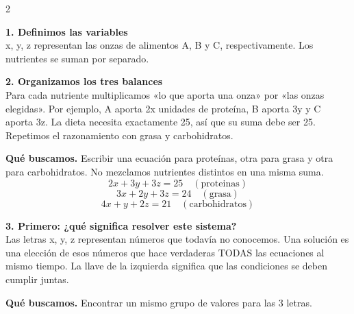\documentclass[11pt,a4paper,landscape]{article}
\begin{document}
\begin{multicols*}{2}
\noindent\begin{minipage}{\linewidth}\textbf{1. Definimos las variables}\\[2pt]x, y, z representan las onzas de alimentos A, B y C, respectivamente. Los nutrientes se suman por separado.
\par{}\par\smallskip
\end{minipage}\par\medskip
\noindent\begin{minipage}{\linewidth}\textbf{2. Organizamos los tres balances}\\[2pt]Para cada nutriente multiplicamos «lo que aporta una onza» por «las onzas elegidas». Por ejemplo, A aporta 2x unidades de proteína, B aporta 3y y C aporta 3z. La dieta necesita exactamente 25, así que su suma debe ser 25. Repetimos el razonamiento con grasa y carbohidratos.
\par\smallskip\textbf{Qué buscamos.} Escribir una ecuación para proteínas, otra para grasa y otra para carbohidratos. No mezclamos nutrientes distintos en una misma suma.
\[2x+3y+3z=25\quad(\mathrm{proteinas})\]
\[3x+2y+3z=24\quad(\mathrm{grasa})\]
\[4x+y+2z=21\quad(\mathrm{carbohidratos})\]
\end{minipage}\par\medskip
\noindent\begin{minipage}{\linewidth}\textbf{3. Primero: ¿qué significa resolver este sistema?}\\[2pt]Las letras x, y, z representan números que todavía no conocemos. Una solución es una elección de esos números que hace verdaderas TODAS las ecuaciones al mismo tiempo. La llave de la izquierda significa que las condiciones se deben cumplir juntas.
\par\smallskip\textbf{Qué buscamos.} Encontrar un mismo grupo de valores para las 3 letras.

\end{minipage}
\end{multicols*}
\end{document}
